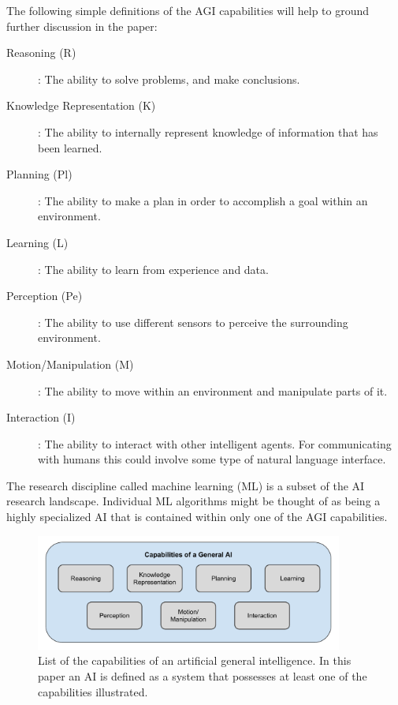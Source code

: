     The following simple definitions of the AGI capabilities will help to ground further discussion in the paper:

    \begin{description}
        \item [Reasoning (R)]: The ability to solve problems, and make conclusions.
        \item [Knowledge Representation (K)]: The ability to internally represent knowledge of information that has been learned.
        \item [Planning (Pl)]: The ability to make a plan in order to accomplish a goal within an environment.
        \item [Learning (L)]: The ability to learn from experience and data.
        \item [Perception (Pe)]: The ability to use different sensors to perceive the surrounding environment.
        \item [Motion/Manipulation (M)]: The ability to move within an environment and manipulate parts of it.
        \item [Interaction (I)]: The ability to interact with other intelligent agents. For communicating with humans this could involve some type of natural language interface.
    \end{description}

    The research discipline called machine learning (ML) is a subset of the AI research landscape. Individual ML algorithms might be thought of as being a highly specialized AI that is contained within only one of the AGI capabilities.

	\begin{figure}[htbp]
    	\centering
     	\includegraphics[width=0.9\textwidth]{Figures/AI_capabilities}
    	\caption{List of the capabilities of an artificial general intelligence. In this paper an AI is defined as a system that possesses at least one of the capabilities illustrated.}
        \label{fig:AIcapabilities}
    \end{figure}

